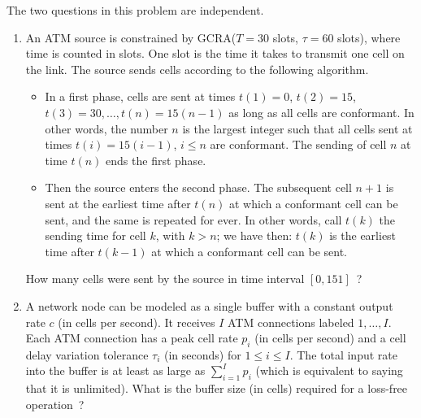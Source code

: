 \begin{problem}

The two questions in this problem are independent.
\begin{enumerate}
        \item  An ATM source is constrained by GCRA($T=30$ slots, $\tau=60$ slots),
where time is counted in slots. One slot is the time it takes to
transmit one cell on the link. The source sends cells according to
the following algorithm.
\begin{itemize}
        \item In a first phase, cells are sent at times $t(1)=0$,
        $t(2)=15$, $t(3)=30, \ldots,t(n)= 15(n-1)$ as long as all cells
        are conformant.  In other words, the number $n$ is the largest
        integer such that all cells sent at times $t(i)=15(i-1)$, $i\leq
        n$ are conformant. The sending of  cell $n$ at time $t(n)$ ends
        the first phase.

        \item  Then the source enters the second phase. The subsequent cell
        $n+1$ is sent at the earliest time after
        $t(n)$ at which a conformant cell can be sent, and the same is
        repeated for ever. In other words, call $t(k)$ the sending time for
        cell $k$, with $k>n$; we have then: $t(k)$ is the earliest time after
        $t(k-1)$ at which a conformant cell can be sent.
\end{itemize}

How many cells were sent by the source in time interval $[0, 151]$~?


        \item A network node can be modeled as a single buffer with a
        constant output rate $c$ (in cells per second).  It receives $I$
        ATM connections labeled $1, \ldots, I$.  Each ATM connection has a
        peak cell rate $p_{i}$ (in cells per second) and a cell delay
        variation tolerance $\tau_{i}$ (in seconds) for $1 \leq i \leq I$.
        The total input rate into the buffer is at least as large as
        $\sum_{i=1}^I p_{i}$ (which is equivalent to saying that it is
        unlimited). What is the buffer size (in cells) required for a
        loss-free operation~?

\end{enumerate}
\end{problem}
